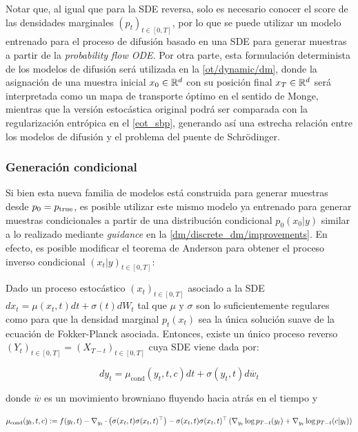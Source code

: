 Notar que, al igual que para la SDE reversa, solo es necesario conocer el score de las densidades marginales $(p_t)_{t\in[0,T]}$, por lo que se puede utilizar un modelo entrenado para el proceso de difusión basado en una SDE para generar muestras a partir de la \textit{probability flow ODE}. Por otra parte, esta formulación determinista de los modelos de difusión será utilizada en la \autoref{ot/dynamic/dm}, donde la asignación de una muestra inicial $x_0\in\mathbb{R}^d$ con su posición final $x_T\in\mathbb{R}^d$ será interpretada como un mapa de transporte óptimo en el sentido de Monge, mientras que la versión estocástica original podrá ser comparada con la regularización entrópica en el \autoref{eot_sbp}, generando así una estrecha relación entre los modelos de difusión y el problema del puente de Schrödinger.

\subsubsection{Generación condicional}

Si bien esta nueva familia de modelos está construida para generar muestras desde $p_0=p_{\operatorname{true}}$, es posible utilizar este mismo modelo ya entrenado para generar muestras condicionales a partir de una distribución condicional $p_0(x_0|y)$ similar a lo realizado mediante \textit{guidance} en la \autoref{dm/discrete_dm/improvements}. En efecto, es posible modificar el teorema de Anderson para obtener el proceso inverso condicional $(x_t|y)_{t\in[0,T]}$:

\begin{teo}
    \label{teo:anderson_conditional}

    Dado un proceso estocástico $(x_t)_{t\in[0,T]}$ asociado a la SDE $dx_t=\mu(x_t,t)dt+\sigma(t)dW_t$ tal que $\mu$ y $\sigma$ son lo suficientemente regulares como para que la densidad marginal $p_t(x_t)$ sea la única solución suave de la ecuación de Fokker-Planck asociada. Entonces, existe un único proceso reverso $(Y_t)_{t\in[0,T]}=(X_{T-t})_{t\in[0,T]}$ cuya SDE viene dada por:

    \begin{equation}
        dy_t = \mu_{\operatorname{cond}}(y_t,t,c) dt + \sigma(y_t,t)d\overline{w}_t
        \label{eq:reverse_conditional_sde}
    \end{equation}

    donde $\overline{w}$ es un movimiento browniano fluyendo hacia atrás en el tiempo y

    \begin{equation}
        \mu_{\operatorname{cond}}(y_t,t,c) := f(y_t,t) - \nabla_{y_t}\cdot\left(\sigma(x_t,t)\sigma(x_t,t)^\top\right) - \sigma(x_t,t)\sigma(x_t,t)^\top \left(\nabla_{y_t} \log p_{T-t}(y_t) + \nabla_{y_t} \log p_{T-t}(c|y_t)\right)
    \end{equation}

\end{teo}

